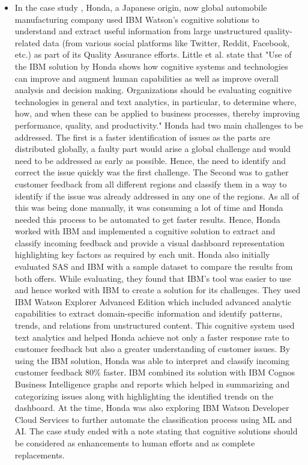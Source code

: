 \begin{itemize}
    \item In the case study \cite{2017honda}, Honda, a Japanese origin, now global automobile manufacturing company used \acs{IBM} Watson's cognitive solutions to understand and extract useful information from large unstructured quality-related data (from various social platforms like Twitter, Reddit, Facebook, etc.) as part of its Quality Assurance efforts. Little et al. state that "Use of the \acs{IBM} solution by Honda shows how cognitive systems and technologies can improve and augment human capabilities as well as improve overall analysis and decision making. Organizations should be evaluating cognitive technologies in general and text analytics, in particular, to determine where, how, and when these can be applied to business processes, thereby improving performance, quality, and productivity." Honda had two main challenges to be addressed. The first is a faster identification of issues as the parts are distributed globally, a faulty part would arise a global challenge and would need to be addressed as early as possible. Hence, the need to identify and correct the issue quickly was the first challenge. The Second was to gather customer feedback from all different regions and classify them in a way to identify if the issue was already addressed in any one of the regions. As all of this was being done manually, it was consuming a lot of time and Honda needed this process to be automated to get faster results. Hence, Honda worked with \acs{IBM} and implemented a cognitive solution to extract and classify incoming feedback and provide a visual dashboard representation highlighting key factors as required by each unit. Honda also initially evaluated SAS \cite{sas} and \acs{IBM} with a sample dataset to compare the results from both offers. While evaluating, they found that \acs{IBM}'s tool was easier to use and hence worked with \acs{IBM} to create a solution for its challenges. They used \acs{IBM} Watson Explorer Advanced Edition which included advanced analytic capabilities to extract domain-specific information and identify patterns, trends, and relations from unstructured content. 
    This cognitive system used text analytics and helped Honda achieve not only a faster response rate to customer feedback but also a greater understanding of customer issues. By using the \acs{IBM} solution, Honda was able to interpret and classify incoming customer feedback 80\% faster. \acs{IBM} combined its solution with \acs{IBM} Cognos Business Intelligence\cite{cognosBI} graphs and reports which helped in summarizing and categorizing issues along with highlighting the identified trends on the dashboard.
    At the time, Honda was also exploring \acs{IBM} Watson Developer Cloud Services to further automate the classification process using \acs{ML} and \acs{AI}. The case study ended with a note stating that cognitive solutions should be considered as enhancements to human efforts and as complete replacements.
\end{itemize}